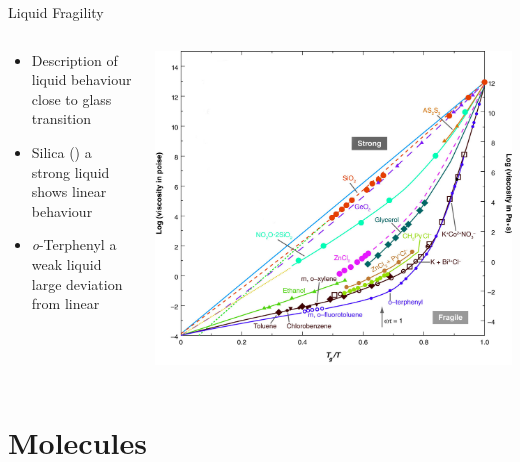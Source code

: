 \documentclass[16pt, aspectratio=43,compress]{beamer}
\begin{document}
\begin{frame}{Liquid Fragility}
    \begin{columns}
        \begin{column}{0.5\linewidth}
            \begin{itemize}
                \item Description of liquid behaviour close to glass transition
                \item Silica () a strong liquid shows linear behaviour
                \item {\em o}-Terphenyl a weak liquid large deviation from linear
            \end{itemize}
        \end{column}
        \begin{column}{0.5\linewidth}
            \includegraphics[width=\textwidth]{angell}
        \end{column}
    \end{columns}
\end{frame}


\section{Molecules}
\end{document}
